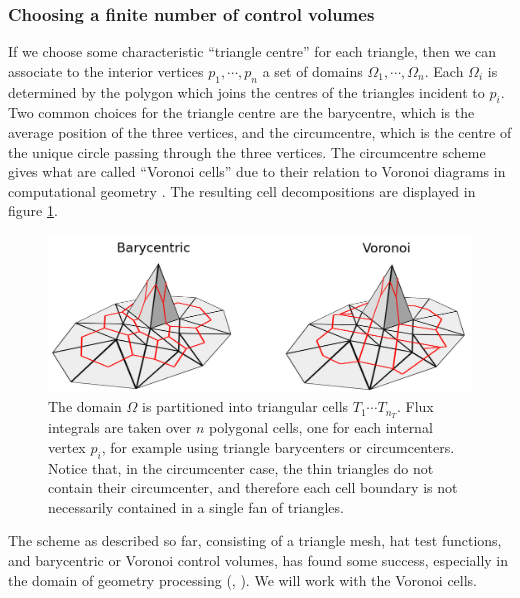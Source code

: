 \subsubsection{Choosing a finite number of control volumes}
If we choose some characteristic ``triangle centre'' for each triangle, then we can associate to the interior vertices
$p_1,\cdots,p_n$ a set of domains $\Omega_1,\cdots,\Omega_n$. Each $\Omega_i$ is determined by the polygon which joins the centres of the triangles
incident to $p_i$.
Two common choices for the triangle centre are the barycentre, which is the average position of the three vertices, and the circumcentre,
which is the centre of the unique circle passing through the three vertices. The circumcentre scheme gives what are called
``Voronoi cells'' due to their relation to Voronoi diagrams in computational geometry \cite{orourke}.
The resulting cell decompositions are displayed in figure
\ref{cell_decompositions}.

\begin{figure}[H]
    \begin{center}
        \includegraphics[width=0.7\linewidth]{figures/cell.png}
    \end{center}
    \caption{\scriptsize
        The domain $\Omega$ is partitioned into triangular cells $T_1\cdots T_{n_T}$.
        Flux integrals are taken over $n$ polygonal cells, one for each internal vertex $p_i$, for example using triangle barycenters or circumcenters.
        Notice that, in the circumcenter case, the thin triangles do not contain their circumcenter, and therefore each cell boundary is not necessarily
        contained in a single fan of triangles.
    }
    \label{cell_decompositions}
\end{figure}

The scheme as described so far, consisting of a triangle mesh, hat test functions, and barycentric or Voronoi control volumes,
has found some success, especially in the domain of geometry processing (\cite{polygon_mesh_processing}, \cite{ddg_triangulated}).
We will work with the Voronoi cells.

